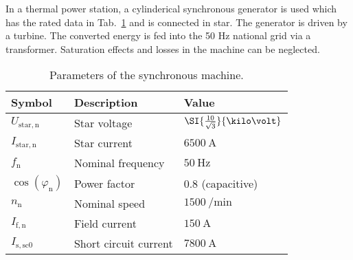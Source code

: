 In a thermal power station, a cylinderical synchronous generator is used which has the rated data in Tab.~\ref{tab:para_cylindericalSynchonousMachine} and is connected in star. The generator is driven by a turbine. The converted energy is fed into the 50 Hz national grid via a transformer. Saturation effects and losses in the machine can be neglected.
\begin{table}[htb]
    \caption{Parameters of the synchronous machine.}
    \centering
    \begin{tabular}{lll}\toprule
    Symbol  & Description       & Value \\
    \midrule
    $U_{\mathrm{star,n}}$ & Star voltage            & $\SI{\frac{10}{\sqrt{3}}}{\kilo\volt}$ \\
    $I_{\mathrm{star,n}}$ & Star current            & $\SI{6500}{\ampere}$ \\
    $f_{\mathrm{n}}$      & Nominal frequency       & $\SI{50}{\hertz}$ \\
    $\cos(\varphi_{\mathrm{n}})$    & Power factor  & 0.8 (capacitive) \\
    $n_{\mathrm{n}}$        & Nominal speed         & $\SI{1500}{\per\minute}$ \\
    $I_{\mathrm{f,n}}$    & Field current           & $\SI{150}{\ampere}$ \\ 
    $I_{\mathrm{s,sc0}}$  & Short circuit current   & $\SI{7800}{\ampere}$ \\
    \bottomrule
    \end{tabular}
    \label{tab:para_cylindericalSynchonousMachine}
\end{table}




